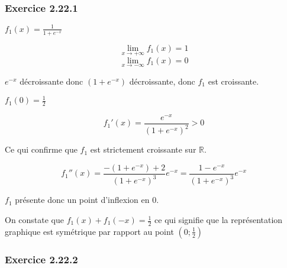 \documentclass[a4paper,10pt]{report}
\begin{document}
\subsubsection*{Exercice 2.22.1}

$f_1(x) = \frac{1}{1+e^{-x}}$

\begin{displaymath}
	\lim_{x \rightarrow +\infty} f_1(x) = 1
\end{displaymath}
\begin{displaymath}
	\lim_{x \rightarrow -\infty} f_1(x) = 0
\end{displaymath}

$e^{-x}$ décroissante donc $(1+e^{-x})$ décroissante, donc $f_1$ est croissante.

$f_1(0) = \frac{1}{2}$

\begin{displaymath}
	f_1'(x) = \frac{e^{-x}}{(1+e^{-x})^2} > 0
\end{displaymath}

Ce qui confirme que $f_1$ est strictement croissante sur $\mathbb{R}$.

\begin{displaymath}
	f_1''(x) = \frac{-(1+e^{-x})+2}{(1+e^{-x})^3}e^{-x}
	         = \frac{1-e^{-x}}{(1+e^{-x})^3}e^{-x}
\end{displaymath}

$f_1$ présente donc un point d'inflexion en $0$.

On constate que $f_1(x) + f_1(-x) = \frac{1}{2}$ ce qui signifie que la représentation
graphique est symétrique par rapport au point $(0 ; \frac{1}{2})$





\subsubsection*{Exercice 2.22.2}
\end{document}
